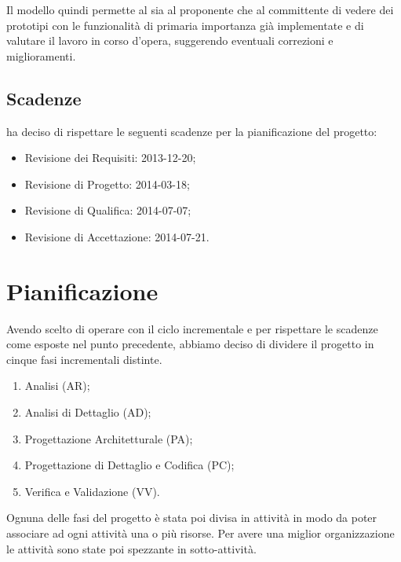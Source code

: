Il modello quindi permette al sia al proponente che al committente di vedere dei prototipi con le funzionalità di primaria importanza già implementate e di valutare il lavoro in corso d'opera, suggerendo eventuali correzioni e miglioramenti.


\subsection{Scadenze}
\label{2.6}
\NomeGruppo{} ha deciso di rispettare le seguenti scadenze per la pianificazione del progetto:
\begin{itemize}
\item Revisione dei Requisiti: 2013-12-20;
\item Revisione di Progetto:  2014-03-18;
\item Revisione di Qualifica: 2014-07-07;
\item Revisione di Accettazione: 2014-07-21.
\end{itemize}

\newpage
\section{Pianificazione}
\label{3.0}
Avendo scelto di operare con il ciclo incrementale e per rispettare le scadenze come esposte nel punto precedente, abbiamo deciso di dividere il progetto in cinque fasi incrementali distinte.

\begin{enumerate}
\item Analisi (AR);
\item Analisi di Dettaglio (AD);
\item Progettazione Architetturale (PA);
\item Progettazione di Dettaglio e Codifica (PC);
\item Verifica e Validazione (VV).
\end{enumerate}

Ognuna delle fasi del progetto è stata poi divisa in attività in modo da poter associare ad ogni attività una o più risorse. Per avere una miglior organizzazione le attività sono state poi spezzante in sotto-attività.



\newpage


\newpage


\newpage


